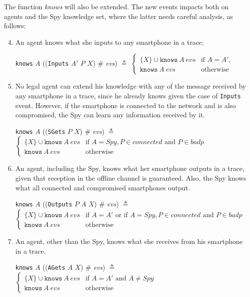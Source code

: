 The function \textit{knows} will also be extended. The new events impacts both on agents and the Spy knowledge set, where the latter needs careful analysis, as follows:
\begin{enumerate}
  \setcounter{enumi}{3}
  \item An agent knows what she inputs to any smartphone in a trace;
  \begin{center}
    \texttt{knows} $A$ ((\texttt{Inputs} $A'$ $P$ $X$) $\#$ \textit{evs}) $\triangleq$ $\begin{cases}
      \{ X\} \cup \texttt{knows}\ A\ evs & \text{if } A = A', \\
      \texttt{knows}\ A\ evs & \text{otherwise}
    \end{cases}$
  \end{center}

  \item No legal agent can extend his knowledge with any of the message received by any smartphone in a trace, since he already knows given the case of \texttt{Inputs} event. However, if the smartphone is connected to the network and is also compromised, the Spy can learn any information received by it.
  \begin{center}
    \texttt{knows} $A$ ((\texttt{SGets} $P$ $X$) $\#$ \textit{evs}) $\triangleq$ $\begin{cases}
      \{ X\} \cup \texttt{knows}\ A\ evs & \text{if } A = Spy, P \in \textit{connected} \text{ and } P \in badp\\
      \texttt{knows}\ A\ evs & \text{otherwise}
    \end{cases}$
  \end{center}

  \item An agent, including the Spy, knows what her smartphone outputs in a trace, given that reception in the offline channel is guaranteed. Also, the Spy knows what all connected and compromised smartphones output.
  \begin{center}
    \texttt{knows} $A$ ((\texttt{Outputs} $P$ $A$ $X$) $\#$ \textit{evs}) $\triangleq$ $\begin{cases}
      \{ X\} \cup \texttt{knows}\ A\ evs & \text{if } A = A' \text{ or if } A = Spy, P \in \textit{connected} \text{ and } P \in badp \\
      \texttt{knows}\ A\ evs & \text{otherwise}
    \end{cases}$
  \end{center}

  \item An agent, other than the Spy, knows what she receives from his smartphone in a trace.
  \begin{center}
    \texttt{knows} $A$ ((\texttt{AGets} $A$ $X$) $\#$ \textit{evs}) $\triangleq$ $\begin{cases}
      \{ X\} \cup \texttt{knows}\ A\ evs & \text{if } A = A' \text{ and } A \neq Spy \\
      \texttt{knows}\ A\ evs & \text{otherwise}
    \end{cases}$
  \end{center}
\end{enumerate}



